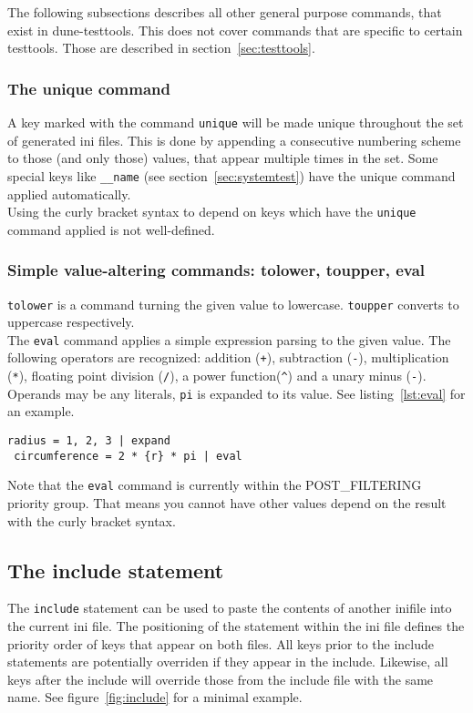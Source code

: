 \documentclass[11pt]{article}
\begin{document}
The following subsections describes all other general purpose commands, that exist in dune-testtools. This does not cover commands that are specific to certain testtools. Those are described in section~\ref{sec:testtools}.

\subsubsection{The unique command}

A key marked with the command \lstinline!unique! will be made unique throughout the set of generated ini files. This is done by appending a consecutive numbering scheme to those (and only those) values, that appear multiple times in the set. Some special keys like \lstinline!__name! (see section~\ref{sec:systemtest}) have the unique command applied automatically. \\

Using the curly bracket syntax to depend on keys which have the \lstinline!unique! command applied is not well-defined.

\subsubsection{Simple value-altering commands: tolower, toupper, eval}

\lstinline!tolower! is a command turning the given value to lowercase. \lstinline!toupper! converts to uppercase respectively. \\

The \lstinline!eval! command applies a simple expression parsing to the given value. The following operators are recognized: addition (\lstinline!+!), subtraction (\lstinline!-!), multiplication (\lstinline!*!), floating point division (\lstinline!/!), a power function(\lstinline!^!) and a unary minus (\lstinline!-!). Operands may be any literals, \lstinline!pi! is expanded to its value. See listing~\ref{lst:eval} for an example.

\begin{lstlisting}[caption={An example of the eval command},label=lst:eval]
 radius = 1, 2, 3 | expand
 circumference = 2 * {r} * pi | eval
\end{lstlisting}

Note that the \lstinline!eval! command is currently within the POST\_FILTERING priority group. That means you cannot have other values depend on the result with the curly bracket syntax.

\subsection{The include statement}
The \lstinline!include! statement can be used to paste the contents of another inifile into the current ini file. The positioning of the statement within the ini file defines the priority order of keys that appear on both files. All keys prior to the include statements are potentially overriden if they appear in the include. Likewise, all keys after the include will override those from the include file with the same name. See figure~\ref{fig:include} for a minimal example. \\
\end{document}
